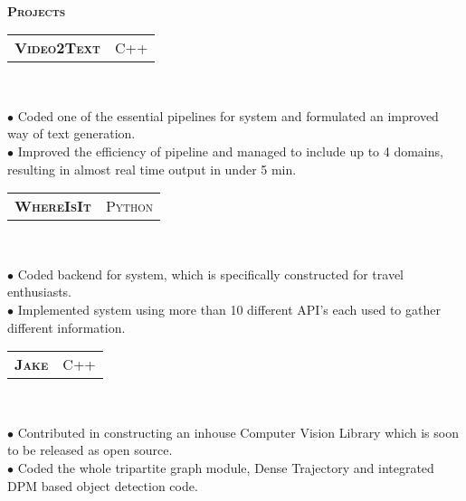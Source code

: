 \documentclass[10pt,a4paper,oneside]{article}
\begin{document}
    \vspace{4pt}\\
    \textcolor{light-gray}{\textbf{\large P\textsc{rojects}}}
    \vspace{4pt}\\
    \begin{tabular}{c|c}
        \textbf{\normalsize V\textsc{ideo}2T\textsc{ext}}
        &\textmd{\normalsize C\textsc{++}}
    \end{tabular}\\
    \vspace{-4mm}
    \begin{adjustwidth}{7pt}{0pt}
        {\footnotesize $\bullet$ Coded one of the essential pipelines for system and formulated an improved way of text generation.\\
        $\bullet$ Improved the efficiency of pipeline and managed to include up to 4 domains, resulting in almost real time output in under 5 min. }\\ 
    \end{adjustwidth}
    \vspace{-6pt}
    \begin{tabular}{c|c}
        \textbf{\normalsize W\textsc{here}I\textsc{s}I\textsc{t}}
        &\textmd{\normalsize P\textsc{ython}}
    \end{tabular}\\
     \vspace{-4mm}
    \begin{adjustwidth}{7pt}{0pt}
            {\footnotesize $\bullet$ Coded backend for system, which is specifically constructed for travel enthusiasts.\\ 
            $\bullet$ Implemented system using more than 10 different API's each used to gather different information.}\\ 
    \end{adjustwidth}
    \vspace{-6pt}
    \begin{tabular}{c|c}
        \textbf{\normalsize J\textsc{ake}}
        &\textmd{\normalsize C\textsc{++}}
    \end{tabular}\\
     \vspace{-4mm}
    \begin{adjustwidth}{7pt}{0pt}
        {\footnotesize $\bullet$ Contributed in constructing an inhouse Computer Vision Library which is soon to be released as open source.\\
        $\bullet$ Coded the whole tripartite graph module, Dense Trajectory and integrated DPM based object detection code.}\\
    \end{adjustwidth}
\end{document}
